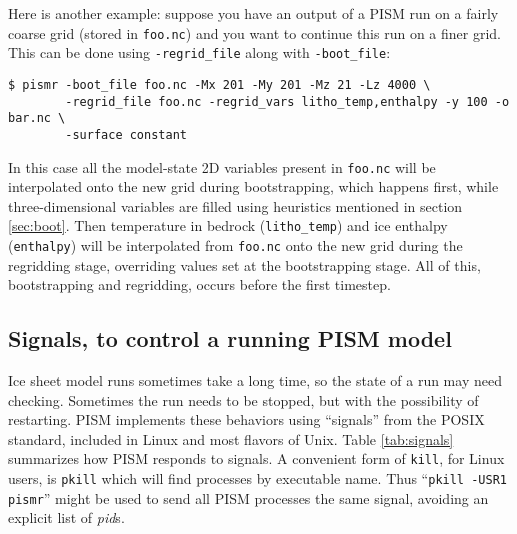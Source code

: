Here is another example: suppose you have an output of a PISM run on a fairly
coarse grid (stored in \texttt{foo.nc}) and you want to continue this run on a
finer grid. This can be done using \texttt{-regrid_file} along with
\texttt{-boot_file}:
\begin{verbatim}
$ pismr -boot_file foo.nc -Mx 201 -My 201 -Mz 21 -Lz 4000 \
        -regrid_file foo.nc -regrid_vars litho_temp,enthalpy -y 100 -o bar.nc \
        -surface constant
\end{verbatim}
In this case all the model-state 2D variables present in \texttt{foo.nc} will
be interpolated onto the new grid during bootstrapping, which happens first,
while three-dimensional variables are filled using heuristics mentioned in
section \ref{sec:boot}.  Then temperature in bedrock (\texttt{litho_temp}) and
ice enthalpy (\texttt{enthalpy}) will be interpolated from \texttt{foo.nc} onto the
new grid during the regridding stage, overriding values set at the
bootstrapping stage.  All of this, bootstrapping and regridding, occurs before
the first timestep.


\newcommand\pid{\textsl{pid}s}

\subsection{Signals, to control a running PISM model} \label{subsect:signal}    Ice sheet model runs sometimes take a long time, so the state of a run may need checking.  Sometimes the run needs to be stopped, but with the possibility of restarting.  PISM implements these behaviors using ``signals'' from the POSIX standard, included in Linux and most flavors of Unix.  Table \ref{tab:signals} summarizes how PISM responds to signals.  A convenient form of \texttt{kill}, for Linux users, is \texttt{pkill} which will find processes by executable name.  Thus ``\texttt{pkill -USR1 pismr}'' might be used to send all PISM processes the same signal, avoiding an explicit list of \pid.

